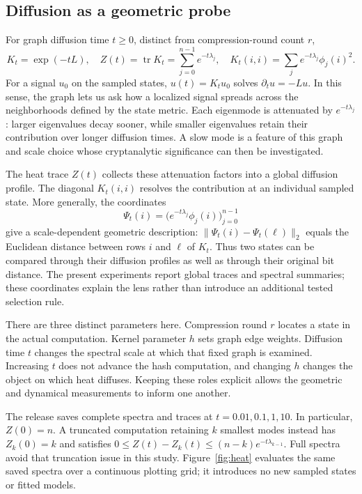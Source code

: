 \documentclass[11pt]{article}
\begin{document}
\subsection{Diffusion as a geometric probe}
For graph diffusion time $t\geq0$, distinct from compression-round count $r$,
\begin{equation}
 K_t=\exp(-tL),\quad Z(t)=\operatorname{tr}K_t=\sum_{j=0}^{n-1}e^{-t\lambda_j},\quad
 K_t(i,i)=\sum_j e^{-t\lambda_j}\phi_j(i)^2.
\end{equation}
For a signal $u_0$ on the sampled states, $u(t)=K_tu_0$ solves $\partial_tu=-Lu$. In this sense, the graph lets us ask how a localized signal spreads across the neighborhoods defined by the state metric. Each eigenmode is attenuated by $e^{-t\lambda_j}$: larger eigenvalues decay sooner, while smaller eigenvalues retain their contribution over longer diffusion times. A slow mode is a feature of this graph and scale choice whose cryptanalytic significance can then be investigated.

The heat trace $Z(t)$ collects these attenuation factors into a global diffusion profile. The diagonal $K_t(i,i)$ resolves the contribution at an individual sampled state. More generally, the coordinates
\begin{equation}
 \Psi_t(i)=\bigl(e^{-t\lambda_j}\phi_j(i)\bigr)_{j=0}^{n-1}
\end{equation}
give a scale-dependent geometric description: $\|\Psi_t(i)-\Psi_t(\ell)\|_2$ equals the Euclidean distance between rows $i$ and $\ell$ of $K_t$. Thus two states can be compared through their diffusion profiles as well as through their original bit distance. The present experiments report global traces and spectral summaries; these coordinates explain the lens rather than introduce an additional tested selection rule.

There are three distinct parameters here. Compression round $r$ locates a state in the actual computation. Kernel parameter $h$ sets graph edge weights. Diffusion time $t$ changes the spectral scale at which that fixed graph is examined. Increasing $t$ does not advance the hash computation, and changing $h$ changes the object on which heat diffuses. Keeping these roles explicit allows the geometric and dynamical measurements to inform one another.

The release saves complete spectra and traces at $t=0.01,0.1,1,10$. In particular, $Z(0)=n$. A truncated computation retaining $k$ smallest modes instead has $Z_k(0)=k$ and satisfies $0\leq Z(t)-Z_k(t)\leq(n-k)e^{-t\lambda_{k-1}}$. Full spectra avoid that truncation issue in this study. Figure~\ref{fig:heat} evaluates the same saved spectra over a continuous plotting grid; it introduces no new sampled states or fitted models.
\end{document}
